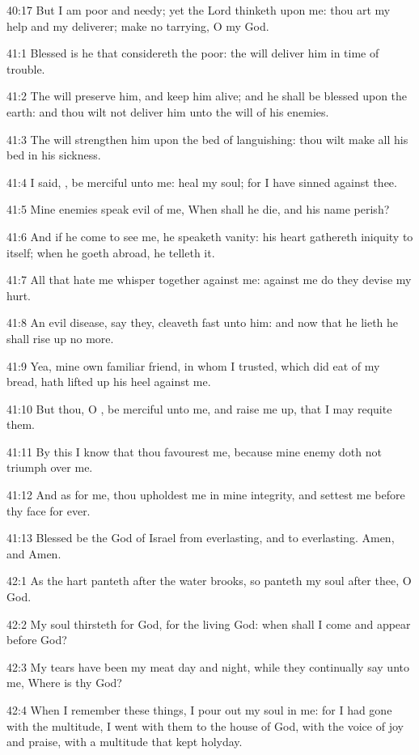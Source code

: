 40:17 But I am poor and needy; yet the Lord thinketh upon me: thou art my help and my deliverer; make no tarrying, O my God.



41:1 Blessed is he that considereth the poor: the \LORD will deliver him in time of trouble.

41:2 The \LORD will preserve him, and keep him alive; and he shall be blessed upon the earth: and thou wilt not deliver him unto the will of his enemies.

41:3 The \LORD will strengthen him upon the bed of languishing: thou wilt make all his bed in his sickness.

41:4 I said, \LORD, be merciful unto me: heal my soul; for I have sinned against thee.

41:5 Mine enemies speak evil of me, When shall he die, and his name perish?

41:6 And if he come to see me, he speaketh vanity: his heart gathereth iniquity to itself; when he goeth abroad, he telleth it.

41:7 All that hate me whisper together against me: against me do they devise my hurt.

41:8 An evil disease, say they, cleaveth fast unto him: and now that he lieth he shall rise up no more.

41:9 Yea, mine own familiar friend, in whom I trusted, which did eat of my bread, hath lifted up his heel against me.

41:10 But thou, O \LORD, be merciful unto me, and raise me up, that I may requite them.

41:11 By this I know that thou favourest me, because mine enemy doth not triumph over me.

41:12 And as for me, thou upholdest me in mine integrity, and settest me before thy face for ever.

41:13 Blessed be the \LORD God of Israel from everlasting, and to everlasting. Amen, and Amen.



42:1 As the hart panteth after the water brooks, so panteth my soul after thee, O God.

42:2 My soul thirsteth for God, for the living God: when shall I come and appear before God?

42:3 My tears have been my meat day and night, while they continually say unto me, Where is thy God?

42:4 When I remember these things, I pour out my soul in me: for I had gone with the multitude, I went with them to the house of God, with the voice of joy and praise, with a multitude that kept holyday.

